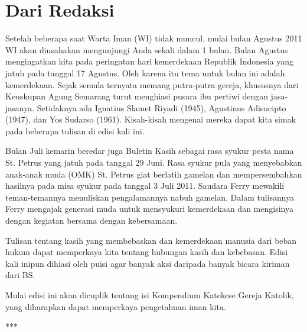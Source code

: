 \newpage

\section*{\center Dari Redaksi}


Setelah beberapa saat Warta Iman (WI) tidak muncul, mulai bulan Agustus 2011 WI akan diusahakan mengunjungi Anda sekali dalam 1 bulan. Bulan Agustus mengingatkan kita pada peringatan hari kemerdekaan Republik Indonesia yang jatuh pada tanggal 17 Agustus. Oleh karena itu tema untuk bulan ini adalah kemerdekaan. 
Sejak semula ternyata memang putra-putra gereja, khususnya dari Keuskupan Agung Semarang turut menghiasi pusara ibu pertiwi dengan jasa-jasanya. Setidaknya ada Ignatius Slamet Riyadi (1945), Agustinus Adisucipto (1947), dan Yos Sudarso (1961). Kisah-kisah mengenai mereka dapat kita simak pada beberapa tulisan di edisi kali ini.

Bulan Juli kemarin beredar juga Buletin Kasih sebagai rasa syukur pesta nama St. Petrus yang jatuh pada tanggal 29 Juni. Rasa syukur pula yang menyebabkan anak-anak muda (OMK) St. Petrus giat berlatih gamelan dan mempersembahkan hasilnya pada misa syukur pada tanggal 3 Juli 2011. Saudara Ferry mewakili teman-temannya menuliskan pengalamannya nabuh gamelan. Dalam tulisannya Ferry mengajak generasi muda untuk mensyukuri kemerdekaan dan mengisinya dengan kegiatan bersama dengan kebersamaan.

Tulisan tentang kasih yang membebaskan dan kemerdekaan manusia dari beban hukum dapat memperkaya kita tentang hubungan kasih dan kebebasan. Edisi kali inipun dihiasi oleh puisi agar banyak aksi daripada banyak bicara kiriman dari BS. 

Mulai edisi ini akan dicuplik tentang isi Kompendium Katekese Gereja Katolik, yang diharapkan dapat memperkaya pengetahuan iman kita.

\begin{center}***\end{center} 

\vspace*{1.3cm}

